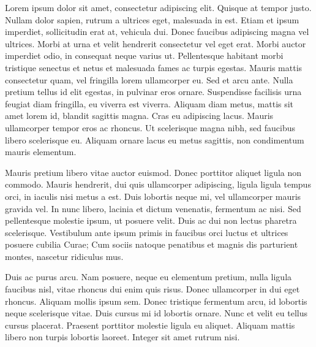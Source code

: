 Lorem ipsum dolor sit amet, consectetur adipiscing elit. Quisque at tempor justo. Nullam dolor sapien, rutrum a ultrices eget, malesuada in est. Etiam et ipsum imperdiet, sollicitudin erat at, vehicula dui. Donec faucibus adipiscing magna vel ultrices. Morbi at urna et velit hendrerit consectetur vel eget erat. Morbi auctor imperdiet odio, in consequat neque varius ut. Pellentesque habitant morbi tristique senectus et netus et malesuada fames ac turpis egestas. Mauris mattis consectetur quam, vel fringilla lorem ullamcorper eu. Sed et arcu ante. Nulla pretium tellus id elit egestas, in pulvinar eros ornare. Suspendisse facilisis urna feugiat diam fringilla, eu viverra est viverra. Aliquam diam metus, mattis sit amet lorem id, blandit sagittis magna. Cras eu adipiscing lacus. Mauris ullamcorper tempor eros ac rhoncus. Ut scelerisque magna nibh, sed faucibus libero scelerisque eu. Aliquam ornare lacus eu metus sagittis, non condimentum mauris elementum.

Mauris pretium libero vitae auctor euismod. Donec porttitor aliquet ligula non commodo. Mauris hendrerit, dui quis ullamcorper adipiscing, ligula ligula tempus orci, in iaculis nisi metus a est. Duis lobortis neque mi, vel ullamcorper mauris gravida vel. In nunc libero, lacinia et dictum venenatis, fermentum ac nisi. Sed pellentesque molestie ipsum, ut posuere velit. Duis ac dui non lectus pharetra scelerisque. Vestibulum ante ipsum primis in faucibus orci luctus et ultrices posuere cubilia Curae; Cum sociis natoque penatibus et magnis dis parturient montes, nascetur ridiculus mus.

Duis ac purus arcu. Nam posuere, neque eu elementum pretium, nulla ligula faucibus nisl, vitae rhoncus dui enim quis risus. Donec ullamcorper in dui eget rhoncus. Aliquam mollis ipsum sem. Donec tristique fermentum arcu, id lobortis neque scelerisque vitae. Duis cursus mi id lobortis ornare. Nunc et velit eu tellus cursus placerat. Praesent porttitor molestie ligula eu aliquet. Aliquam mattis libero non turpis lobortis laoreet. Integer sit amet rutrum nisi.

